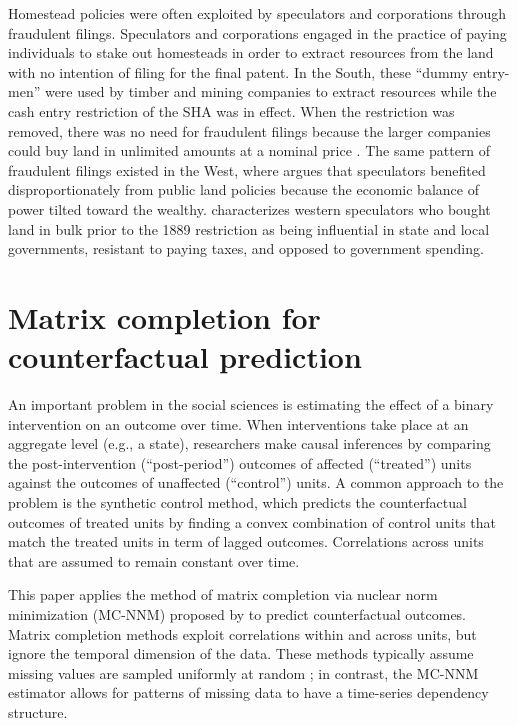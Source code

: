 Homestead policies were often exploited by speculators and corporations through fraudulent filings. Speculators and corporations engaged in the practice of paying individuals to stake out homesteads in order to extract resources from the land with no intention of filing for the final patent. In the South, these ``dummy entry-men'' were used by timber and mining companies to extract resources while the cash entry restriction of the SHA was in effect. When the restriction was removed, there was no need for fraudulent filings because the larger companies could buy land in unlimited amounts at a nominal price \citep{gates1940federal, gates1979federal}. The same pattern of fraudulent filings existed in the West, where \citet{murtazashvili2013political} argues that speculators benefited disproportionately from public land policies because the economic balance of power tilted toward the wealthy. \citet{gates1942role} characterizes western speculators who bought land in bulk prior to the 1889 restriction as being influential in state and local governments, resistant to paying taxes, and opposed to government spending. 

\section{Matrix completion for counterfactual prediction} \label{estimation}

An important problem in the social sciences is estimating the effect of a binary intervention on an outcome over time. When interventions take place at an aggregate level (e.g., a state), researchers make causal inferences by comparing the post-intervention (``post-period'') outcomes of affected (``treated'') units against the outcomes of unaffected  (``control'') units. A common approach to the problem is the synthetic control method, which predicts the counterfactual outcomes of treated units by finding a convex combination of control units that match the treated units in term of lagged outcomes. Correlations across units that are assumed to remain constant over time. 

This paper applies the method of matrix completion via nuclear norm minimization (MC-NNM) proposed by \citet{athey2017matrix} to predict counterfactual outcomes. Matrix completion methods \citep[e.g.,][]{mazumder2010spectral} exploit correlations within and across units, but ignore the temporal dimension of the data. These methods typically assume missing values are sampled uniformly at random \citep{yoon2018estimating}; in contrast, the MC-NNM estimator allows for patterns of missing data to have a time-series dependency structure. 

